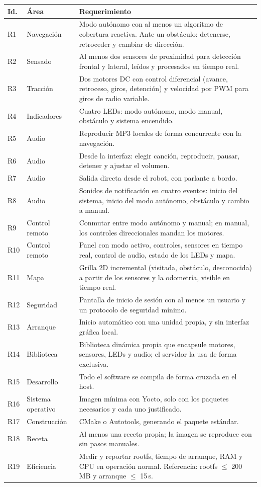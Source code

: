 \documentclass[11pt,a4paper]{article}
\newcommand{\id}[1]{\texttt{\detokenize{#1}}}
\begin{document}
\begin{longtable}{L{1.2cm}L{3.6cm}L{10.2cm}}
\toprule
\textbf{Id.} & \textbf{Área} & \textbf{Requerimiento} \\
\midrule
\endhead
R1 & Navegación & Modo autónomo con al menos un algoritmo de cobertura
reactiva. Ante un obstáculo: detenerse, retroceder y cambiar de dirección. \\
R2 & Sensado & Al menos dos sensores de proximidad para detección frontal y
lateral, leídos y procesados en tiempo real. \\
R3 & Tracción & Dos motores DC con control diferencial (avance, retroceso,
giros, detención) y velocidad por PWM para giros de radio variable. \\
R4 & Indicadores & Cuatro LEDs: modo autónomo, modo manual, obstáculo y
sistema encendido. \\
R5 & Audio & Reproducir MP3 locales de forma concurrente con la navegación. \\
R6 & Audio & Desde la interfaz: elegir canción, reproducir, pausar, detener y
ajustar el volumen. \\
R7 & Audio & Salida directa desde el robot, con parlante a bordo. \\
R8 & Audio & Sonidos de notificación en cuatro eventos: inicio del sistema,
inicio del modo autónomo, obstáculo y cambio a manual. \\
R9 & Control remoto & Conmutar entre modo autónomo y manual; en manual, los
controles direccionales mandan los motores. \\
R10 & Control remoto & Panel con modo activo, controles, sensores en tiempo
real, control de audio, estado de los LEDs y mapa. \\
R11 & Mapa & Grilla 2D incremental (visitada, obstáculo, desconocida) a
partir de los sensores y la odometría, visible en tiempo real. \\
R12 & Seguridad & Pantalla de inicio de sesión con al menos un usuario y un
protocolo de seguridad mínimo. \\
R13 & Arranque & Inicio automático con una unidad \id{systemd} propia,
\id{Restart=on-failure} y sin interfaz gráfica local. \\
R14 & Biblioteca & Biblioteca dinámica propia que encapsule motores, sensores,
LEDs y audio; el servidor la usa de forma exclusiva. \\
R15 & Desarrollo & Todo el software se compila de forma cruzada en el host. \\
R16 & Sistema operativo & Imagen mínima con Yocto, solo con los paquetes
necesarios y cada uno justificado. \\
R17 & Construcción & CMake o Autotools, generando el paquete estándar. \\
R18 & Receta & Al menos una receta \id{.bb} propia; la imagen se reproduce
con \id{bitbake <imagen>} sin pasos manuales. \\
R19 & Eficiencia & Medir y reportar rootfs, tiempo de arranque, RAM y CPU en
operación normal. Referencia: rootfs $\leq$ 200\,MB y arranque $\leq$ 15\,s. \\
\bottomrule
\end{longtable}
\end{document}
